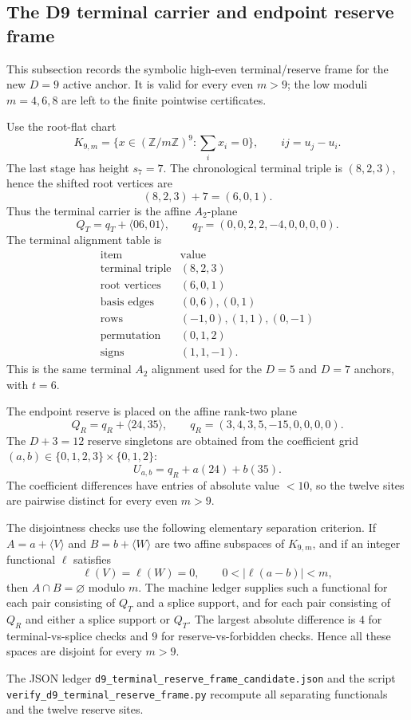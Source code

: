 
\subsection{The D9 terminal carrier and endpoint reserve frame}
\label{app:D9-terminal-reserve-frame}

This subsection records the symbolic high-even terminal/reserve frame for the
new $D=9$ active anchor.  It is valid for every even $m>9$; the low moduli
$m=4,6,8$ are left to the finite pointwise certificates.

Use the root-flat chart
\[
K_{9,m}=\{x\in(\mathbb Z/m\mathbb Z)^9:\sum_i x_i=0\},\qquad ij=u_j-u_i.
\]
The last stage has height $s_7=7$.  The chronological terminal triple is
$(8,2,3)$, hence the shifted root vertices are
\[
(8,2,3)+7=(6,0,1).
\]
Thus the terminal carrier is the affine $A_2$-plane
\[
Q_T=q_T+\langle 06,01\rangle,
\qquad q_T=(0,0,2,2,-4,0,0,0,0).
\]
The terminal alignment table is
\[
\begin{array}{c|c}
\text{item}&\text{value}\\\hline
\text{terminal triple}&(8,2,3)\\
\text{root vertices}&(6,0,1)\\
\text{basis edges}&(0,6),(0,1)\\
\text{rows}&(-1,0),(1,1),(0,-1)\\
\text{permutation}&(0,1,2)\\
\text{signs}&(1,1,-1).
\end{array}
\]
This is the same terminal $A_2$ alignment used for the $D=5$ and $D=7$ anchors,
with $t=6$.

The endpoint reserve is placed on the affine rank-two plane
\[
Q_R=q_R+\langle 24,35\rangle,
\qquad q_R=(3,4,3,5,-15,0,0,0,0).
\]
The $D+3=12$ reserve singletons are obtained from the coefficient grid
$(a,b)\in\{0,1,2,3\}\times\{0,1,2\}$:
\[
U_{a,b}=q_R+a(24)+b(35).
\]
The coefficient differences have entries of absolute value $<10$, so the twelve
sites are pairwise distinct for every even $m>9$.

The disjointness checks use the following elementary separation criterion.  If
$A=a+\langle V\rangle$ and $B=b+\langle W\rangle$ are two affine subspaces of
$K_{9,m}$, and if an integer functional $\ell$ satisfies
\[
\ell(V)=\ell(W)=0,\qquad 0<|\ell(a-b)|<m,
\]
then $A\cap B=\varnothing$ modulo $m$.  The machine ledger supplies such a
functional for each pair consisting of $Q_T$ and a splice support, and for each
pair consisting of $Q_R$ and either a splice support or $Q_T$.  The largest
absolute difference is $4$ for terminal-vs-splice checks and $9$ for
reserve-vs-forbidden checks.  Hence all these spaces are disjoint for every
$m>9$.

The JSON ledger \texttt{d9\_terminal\_reserve\_frame\_candidate.json} and the
script \texttt{verify\_d9\_terminal\_reserve\_frame.py} recompute all separating
functionals and the twelve reserve sites.
